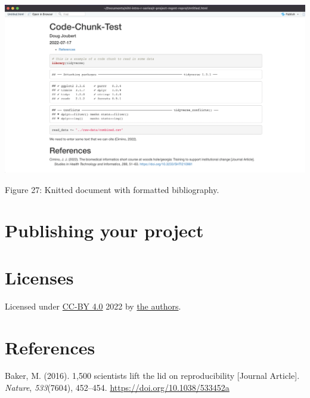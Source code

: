 \documentclass[
]{article}
\newlength{\cslhangindent}
\newlength{\cslentryspacingunit} %
\newenvironment{CSLReferences}[2] %
 {%
  \setlength{\parindent}{0pt}
  \ifodd #1
  \let\oldpar\par
  \def\par{\hangindent=\cslhangindent\oldpar}
  \fi
  \setlength{\parskip}{#2\cslentryspacingunit}
 }%
 {}
\begin{document}
\includegraphics[width=6.66667in,height=\textheight]{images/bib-11.png}

Figure 27: Knitted document with formatted bibliography.

\hypertarget{publishing-your-project}{%
\section{Publishing your project}\label{publishing-your-project}}

\hypertarget{licenses}{%
\section{Licenses}\label{licenses}}

Licensed under \href{https://creativecommons.org/licenses/by/4.0/}{CC-BY
4.0} 2022 by
\href{https://carpentries-incubator.github.io/Reproducible-Publications-with-RStudio/CITATION}{the
authors}.

\hypertarget{references}{%
\section*{References}\label{references}}

\hypertarget{refs}{}
\begin{CSLReferences}{1}{0}
\leavevmode{}%
Baker, M. (2016). 1,500 scientists lift the lid on reproducibility
{[}Journal Article{]}. \emph{Nature}, \emph{533}(7604), 452--454.
\url{https://doi.org/10.1038/533452a}

\end{CSLReferences}
\end{document}
